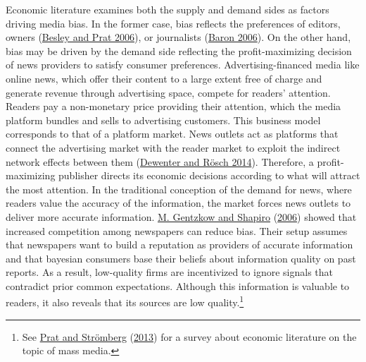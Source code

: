 \documentclass[
  12pt,
]{article}
\begin{document}
Economic literature examines both the supply and demand sides as factors
driving media bias. In the former case, bias reflects the preferences of
editors, owners (\protect\hyperlink{ref-besley_handcuffs_2006}{Besley
and Prat 2006}), or journalists
(\protect\hyperlink{ref-baron_persistent_2006}{Baron 2006}). On the
other hand, bias may be driven by the demand side reflecting the
profit-maximizing decision of news providers to satisfy consumer
preferences. Advertising-financed media like online news, which offer
their content to a large extent free of charge and generate revenue
through advertising space, compete for readers' attention. Readers pay a
non-monetary price providing their attention, which the media platform
bundles and sells to advertising customers. This business model
corresponds to that of a platform market. News outlets act as platforms
that connect the advertising market with the reader market to exploit
the indirect network effects between them
(\protect\hyperlink{ref-dewenter_einfuhrung_2014}{Dewenter and Rösch
2014}). Therefore, a profit-maximizing publisher directs its economic
decisions according to what will attract the most attention. In the
traditional conception of the demand for news, where readers value the
accuracy of the information, the market forces news outlets to deliver
more accurate information.
\protect\hyperlink{ref-gentzkow_media_2006}{M. Gentzkow and Shapiro}
(\protect\hyperlink{ref-gentzkow_media_2006}{2006}) showed that
increased competition among newspapers can reduce bias. Their setup
assumes that newspapers want to build a reputation as providers of
accurate information and that bayesian consumers base their beliefs
about information quality on past reports. As a result, low-quality
firms are incentivized to ignore signals that contradict prior common
expectations. Although this information is valuable to readers, it also
reveals that its sources are low quality.\footnote{See
  \protect\hyperlink{ref-acemoglu_political_2013}{Prat and Strömberg}
  (\protect\hyperlink{ref-acemoglu_political_2013}{2013}) for a survey
  about economic literature on the topic of mass media.}
\end{document}
